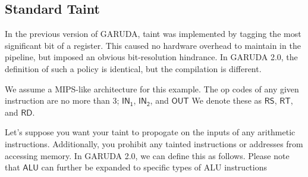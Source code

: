 \documentclass[12pt, letterpaper]{article}
\def \sysname {\textsc{GARUDA 2.0}\xspace}
\def \oldname {\textsc{GARUDA}\xspace}
\begin{document}
    \subsection{Standard Taint}
    

      In the previous version of \oldname, taint was implemented by tagging the most significant bit of a register. 
      This caused no hardware overhead to maintain in the pipeline, but imposed an obvious bit-resolution hindrance.
      In \sysname, the definition of such a policy is identical, but the compilation is different.

      We assume a MIPS-like architecture for this example.
      The op codes of any given instruction are no more than 3; $\mathsf{IN_1}$, $\mathsf{IN_2}$, and $\mathsf{OUT}$
      We denote these as $\mathsf{RS}$, $\mathsf{RT}$, and $\mathsf{RD}$.

      Let's suppose you want your taint to propogate on the inputs of any arithmetic instructions.
      Additionally, you prohibit any tainted instructions or addresses from accessing memory.
      In \sysname, we can define this as follows.
      Please note that $\mathsf{ALU}$ can further be expanded to specific types of ALU instructions
\end{document}
